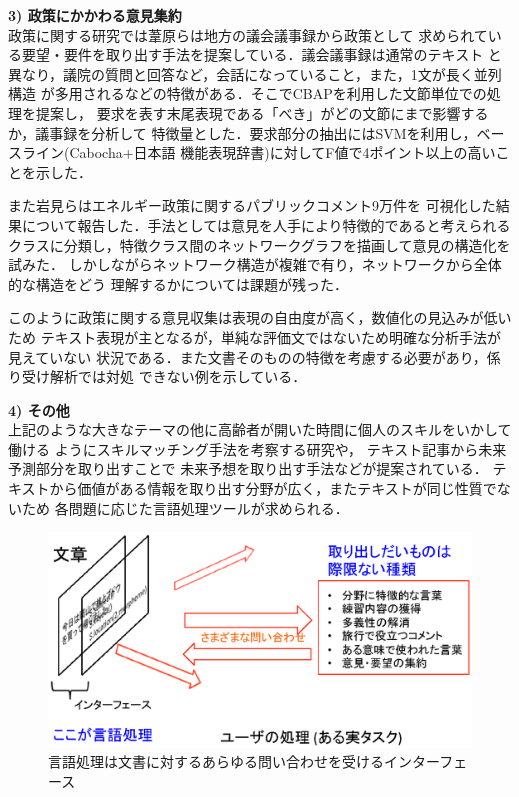\documentclass[twocolumn]{jarticle}
\begin{document}
{\bf 3) 政策にかかわる意見集約}\\
政策に関する研究では葦原ら\cite{ashihara2012}は地方の議会議事録から政策として
求められている要望・要件を取り出す手法を提案している．議会議事録は通常のテキスト
と異なり，議院の質問と回答など，会話になっていること，また，1文が長く並列構造
が多用されるなどの特徴がある．そこでCBAP\cite{maruyama2003}を利用した文節単位での処理を提案し，
要求を表す末尾表現である「べき」がどの文節にまで影響するか，議事録を分析して
特徴量とした．要求部分の抽出にはSVMを利用し，ベースライン(Cabocha+日本語
機能表現辞書)に対してF値で4ポイント以上の高いことを示した．

また岩見ら\cite{iwami2016}はエネルギー政策に関するパブリックコメント9万件を
可視化した結果について報告した．手法としては意見を人手により特徴的であると考えられる
クラスに分類し，特徴クラス間のネットワークグラフを描画して意見の構造化を試みた．
しかしながらネットワーク構造が複雑で有り，ネットワークから全体的な構造をどう
理解するかについては課題が残った．

このように政策に関する意見収集は表現の自由度が高く，数値化の見込みが低いため
テキスト表現が主となるが，単純な評価文ではないため明確な分析手法が見えていない
状況である．また文書そのものの特徴を考慮する必要があり，係り受け解析では対処
できない例を示している．

{\bf 4) その他}\\
上記のような大きなテーマの他に高齢者が開いた時間に個人のスキルをいかして働ける
ようにスキルマッチング手法を考察する研究\cite{miura2015}や，
テキスト記事から未来予測部分を取り出すことで
未来予想を取り出す手法\cite{shimaoka2015}などが提案されている．
テキストから価値がある情報を取り出す分野が広く，またテキストが同じ性質でないため
各問題に応じた言語処理ツールが求められる．


\begin{figure}[t]
\begin{center}
\includegraphics[scale=0.4]{fig/lang.eps}
\end{center}
\caption {言語処理は文書に対するあらゆる問い合わせを受けるインターフェース}
\label{fig:lang}
\end{figure}
\end{document}
